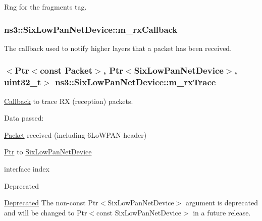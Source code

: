 Rng for the fragments tag. 

\subsubsection[{\texorpdfstring{m\+\_\+rx\+Callback}{m_rxCallback}}]{ ns3\+::\+Six\+Low\+Pan\+Net\+Device\+::m\+\_\+rx\+Callback\hspace{0.3cm}{\ttfamily [private]}}\hypertarget{classns3_1_1SixLowPanNetDevice_ae6028c6ebba2eac40772788104cb57ea}{}\label{classns3_1_1SixLowPanNetDevice_ae6028c6ebba2eac40772788104cb57ea}
The callback used to notify higher layers that a packet has been received. 
\subsubsection[{\texorpdfstring{m\+\_\+rx\+Trace}{m_rxTrace}}]{$<${\bf Ptr}$<$const {\bf Packet}$>$, {\bf Ptr}$<${\bf Six\+Low\+Pan\+Net\+Device}$>$, uint32\+\_\+t$>$ ns3\+::\+Six\+Low\+Pan\+Net\+Device\+::m\+\_\+rx\+Trace\hspace{0.3cm}{\ttfamily [private]}}\hypertarget{classns3_1_1SixLowPanNetDevice_a868eb6580b5eced376dadafa67aeda6b}{}\label{classns3_1_1SixLowPanNetDevice_a868eb6580b5eced376dadafa67aeda6b}


\hyperlink{classns3_1_1Callback}{Callback} to trace RX (reception) packets. 

Data passed\+: \begin{DoxyItemize}
\item \hyperlink{classns3_1_1Packet}{Packet} received (including 6\+Lo\+W\+P\+AN header) \item \hyperlink{classns3_1_1Ptr}{Ptr} to \hyperlink{classns3_1_1SixLowPanNetDevice}{Six\+Low\+Pan\+Net\+Device} \item interface index \begin{DoxyRefDesc}{Deprecated}
\item[\hyperlink{deprecated__deprecated000029}{Deprecated}]The non-\/const {\ttfamily Ptr$<$\+Six\+Low\+Pan\+Net\+Device$>$} argument is deprecated and will be changed to {\ttfamily Ptr$<$const Six\+Low\+Pan\+Net\+Device$>$} in a future release. \end{DoxyRefDesc}
\end{DoxyItemize}

